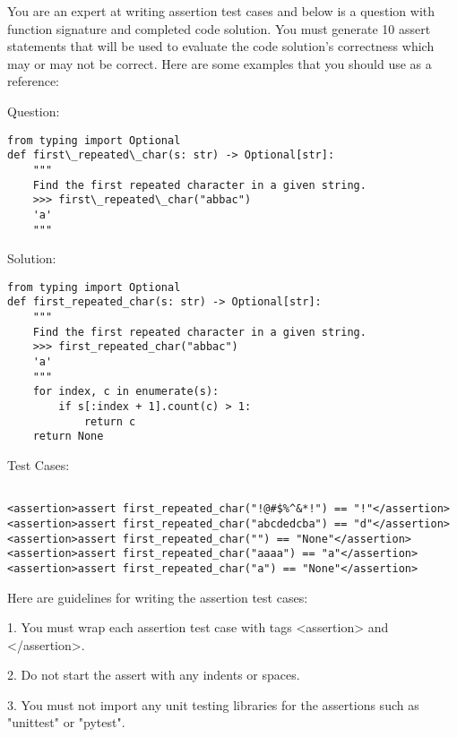 
\begin{figure*}[ht!]
  \centering

\begin{tcolorbox}[title={Test Case Generation With Solution Prompt}, colback=red!0, left=2pt,right=2pt,top=0pt,bottom=0pt]

{ %
You are an expert at writing assertion test cases and below is a question with function signature and completed code solution. You must generate 10 assert statements that will be used to evaluate the code solution's correctness which may or may not be correct. Here are some examples that you should use as a reference:

\vspace{0.15cm}
Question: 

\begin{verbatim}
from typing import Optional
def first\_repeated\_char(s: str) -> Optional[str]:
    """ 
    Find the first repeated character in a given string.
    >>> first\_repeated\_char("abbac")
    'a'
    """
\end{verbatim}

Solution:
\begin{verbatim}
from typing import Optional
def first_repeated_char(s: str) -> Optional[str]:
    """ 
    Find the first repeated character in a given string.
    >>> first_repeated_char("abbac")
    'a'
    """
    for index, c in enumerate(s):
        if s[:index + 1].count(c) > 1:
            return c
    return None
\end{verbatim}

Test Cases:
\begin{verbatim}

<assertion>assert first_repeated_char("!@#$%^&*!") == "!"</assertion>
<assertion>assert first_repeated_char("abcdedcba") == "d"</assertion>
<assertion>assert first_repeated_char("") == "None"</assertion>
<assertion>assert first_repeated_char("aaaa") == "a"</assertion>
<assertion>assert first_repeated_char("a") == "None"</assertion>

\end{verbatim}

Here are guidelines for writing the assertion test cases:

1. You must wrap each assertion test case with tags <assertion> and </assertion>.

2. Do not start the assert with any indents or spaces.

3. You must not import any unit testing libraries for the assertions such as "unittest" or "pytest".

}
\end{tcolorbox}
\end{figure*}
